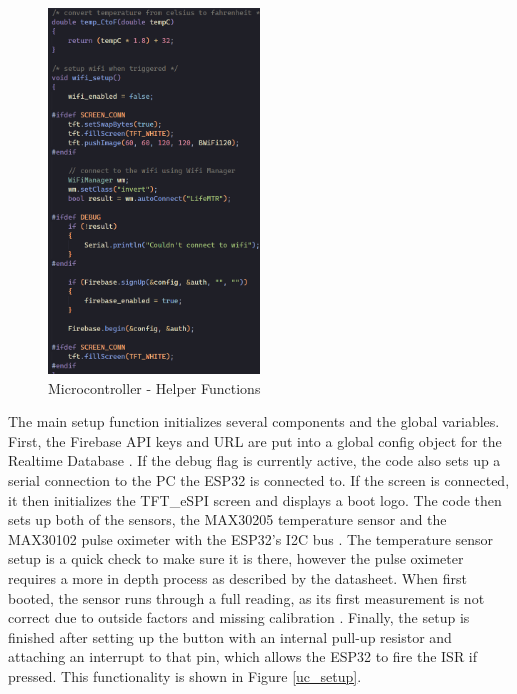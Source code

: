 \documentclass[12pt]{article}
\begin{document}
    \begin{figure}[hbt!]
        \centering
        \includegraphics[width=0.5\textwidth]{uc_helpers}
        \caption{Microcontroller - Helper Functions}
        \label{uc_help}
    \end{figure} 

    The main setup function initializes several components and the global variables. First, the Firebase API keys and URL are put into a global config object for the Realtime Database \cite{firebase_client_lib}. If the debug flag is currently active, the code also sets up a serial connection to the PC the ESP32 is connected to. If the screen is connected, it then initializes the TFT\_eSPI screen and displays a boot logo. The code then sets up both of the sensors, the MAX30205 temperature sensor and the MAX30102 pulse oximeter with the ESP32's I2C bus \cite{protocentral_max30205,sparkfun_max301x}. The temperature sensor setup is a quick check to make sure it is there, however the pulse oximeter requires a more in depth process as described by the datasheet. When first booted, the sensor runs through a full reading, as its first measurement is not correct due to outside factors and missing calibration \cite{max30102}. Finally, the setup is finished after setting up the button with an internal pull-up resistor and attaching an interrupt to that pin, which allows the ESP32 to fire the ISR if pressed. This functionality is shown in Figure \ref{uc_setup}.
\end{document}
